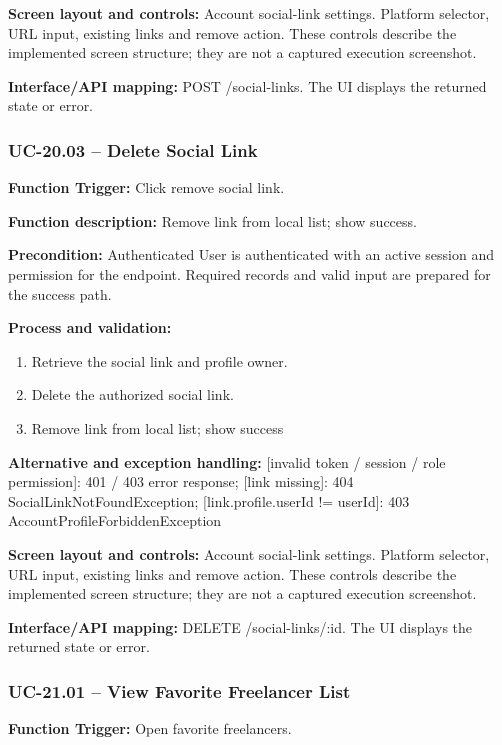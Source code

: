 \textbf{Screen layout and controls:} Account social-link settings. Platform selector, URL input, existing links and remove action. These controls describe the implemented screen structure; they are not a captured execution screenshot.

\textbf{Interface/\allowbreak{}API mapping:} POST /\allowbreak{}social-links. The UI displays the returned state or error.

\subsubsection{UC-20.03 -- Delete Social Link}
\textbf{Function Trigger:} Click remove social link.

\textbf{Function description:} Remove link from local list; show success.

\textbf{Precondition:} Authenticated User is authenticated with an active session and permission for the endpoint. Required records and valid input are prepared for the success path.

\textbf{Process and validation:}
\begin{enumerate}
\item Retrieve the social link and profile owner.
\item Delete the authorized social link.
\item Remove link from local list; show success
\end{enumerate}
\textbf{Alternative and exception handling:} [invalid token /\allowbreak{} session /\allowbreak{} role permission]: 401 /\allowbreak{} 403 error response; [link missing]: 404 Social\allowbreak{}Link\allowbreak{}Not\allowbreak{}Found\allowbreak{}Exception; [link.profile.user\allowbreak{}Id !=\allowbreak{} user\allowbreak{}Id]: 403 Account\allowbreak{}Profile\allowbreak{}Forbidden\allowbreak{}Exception

\textbf{Screen layout and controls:} Account social-link settings. Platform selector, URL input, existing links and remove action. These controls describe the implemented screen structure; they are not a captured execution screenshot.

\textbf{Interface/\allowbreak{}API mapping:} DELETE /\allowbreak{}social-links/\allowbreak{}:id. The UI displays the returned state or error.

\subsubsection{UC-21.01 -- View Favorite Freelancer List}
\textbf{Function Trigger:} Open favorite freelancers.

